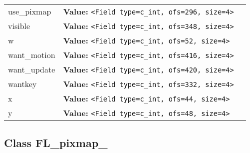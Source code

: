 \begin{longtable}{|p{\varnamewidth}|p{\vardescrwidth}|l}
\cline{1-2}
\raggedright u\-s\-e\-\_\-p\-i\-x\-m\-a\-p\- & \raggedright \textbf{Value:} 
{\tt {\textless}Field type=c\_int, ofs=296, size=4{\textgreater}}&\\
\cline{1-2}
\raggedright v\-i\-s\-i\-b\-l\-e\- & \raggedright \textbf{Value:} 
{\tt {\textless}Field type=c\_int, ofs=348, size=4{\textgreater}}&\\
\cline{1-2}
\raggedright w\- & \raggedright \textbf{Value:} 
{\tt {\textless}Field type=c\_int, ofs=52, size=4{\textgreater}}&\\
\cline{1-2}
\raggedright w\-a\-n\-t\-\_\-m\-o\-t\-i\-o\-n\- & \raggedright \textbf{Value:} 
{\tt {\textless}Field type=c\_int, ofs=416, size=4{\textgreater}}&\\
\cline{1-2}
\raggedright w\-a\-n\-t\-\_\-u\-p\-d\-a\-t\-e\- & \raggedright \textbf{Value:} 
{\tt {\textless}Field type=c\_int, ofs=420, size=4{\textgreater}}&\\
\cline{1-2}
\raggedright w\-a\-n\-t\-k\-e\-y\- & \raggedright \textbf{Value:} 
{\tt {\textless}Field type=c\_int, ofs=332, size=4{\textgreater}}&\\
\cline{1-2}
\raggedright x\- & \raggedright \textbf{Value:} 
{\tt {\textless}Field type=c\_int, ofs=44, size=4{\textgreater}}&\\
\cline{1-2}
\raggedright y\- & \raggedright \textbf{Value:} 
{\tt {\textless}Field type=c\_int, ofs=48, size=4{\textgreater}}&\\
\cline{1-2}
\end{longtable}



\subsection{Class FL\_pixmap\_}

